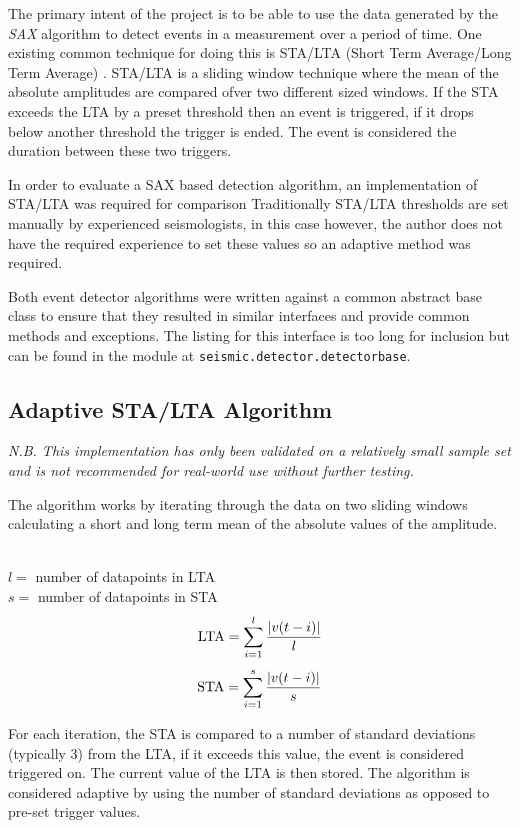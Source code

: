 \documentclass[../report.tex]{subfiles}
\begin{document}
 
	The primary intent of the project is to be able to use the data generated by the \textit{SAX} algorithm to detect events in a measurement over a period of time.  One existing common technique for doing this is STA/LTA (Short Term Average/Long Term Average) \citep{man-seis-obs}.  STA/LTA is a sliding window technique where the mean of the absolute amplitudes are compared ofver two different sized windows.  If the STA exceeds the LTA by a preset threshold then an event is triggered, if it drops below another threshold the trigger is ended.  The event is considered the duration between these two triggers.
	
	In order to evaluate a SAX based detection algorithm, an implementation of STA/LTA was required for comparison  Traditionally STA/LTA thresholds are set manually by experienced seismologists, in this case however, the author does not have the required experience to set these values so an adaptive method was required.
	
	Both event detector algorithms were written against a common abstract base class to ensure that they resulted in similar interfaces and provide common methods and exceptions.  The listing for this interface is too long for inclusion but can be found in the module at \verb|seismic.detector.detectorbase|.
	
\subsection{Adaptive STA/LTA Algorithm} \label{sec:stalta-detect}

	\textit{N.B.  This implementation has only been validated on a relatively small sample set and is not recommended for real-world use without further testing.}

	The algorithm works by iterating through the data on two sliding windows calculating a short and long term mean of the absolute values of the amplitude.

	\noindent
	\\
	$l = $ number of datapoints in LTA \\
	$s = $ number of datapoints in STA \\

	$$ \text{LTA} = \sum_{i=1}^{l}\dfrac{\abs{v(t - i)}}{l} $$
	$$ \text{STA} = \sum_{i=1}^{s}\dfrac{\abs{v(t - i)}}{s} $$

	
	For each iteration, the STA is compared to a number of standard deviations (typically 3) from the LTA, if it exceeds this value, the event is considered triggered on.  The current value of the LTA is then stored.  The algorithm is considered adaptive by using the number of standard deviations as opposed to pre-set trigger values.
	
\end{document}
